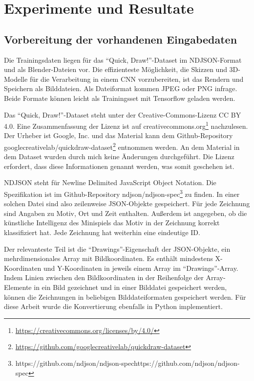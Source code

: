 \chapter{Experimente und Resultate}
\label{ch:conduct}

\section{Vorbereitung der vorhandenen Eingabedaten}
\label{sec:preparation}
Die Trainingsdaten liegen für das ``Quick, Draw!''-Dataset im NDJSON-Format und als Blender-Dateien vor. Die effizienteste Möglichkeit, die Skizzen und 3D-Modelle für die Verarbeitung in einem CNN vorzubereiten, ist das Rendern und  Speichern als Bilddateien. Als Dateiformat kommen JPEG oder PNG infrage. Beide Formate können leicht als Trainingsset mit Tensorflow geladen werden.

Das ``Quick, Draw!''-Dataset steht unter der Creative-Commons-Lizenz CC BY 4.0. Eine Zusammenfassung der Lizenz ist auf creativecommons.org\footnote{\href{https://creativecommons.org/licenses/by/4.0/}{https://creativecommons.org/licenses/by/4.0/}} nachzulesen. Der Urheber ist Google, Inc. und das Material kann dem Github-Repository googlecreativelab/quickdraw-dataset\footnote{\href{https://github.com/googlecreativelab/quickdraw-dataset}{https://github.com/googlecreativelab/quickdraw-dataset}} entnommen werden. An dem Material in dem Dataset wurden durch mich keine Änderungen durchgeführt. Die Lizenz erfordert, dass diese Informationen genannt werden, was somit geschehen ist.

NDJSON steht für Newline Delimited JavaScript Object Notation. Die Spezifikation ist im Github-Repository ndjson/ndjson-spec\footnote{{https://github.com/ndjson/ndjson-spec}{https://github.com/ndjson/ndjson-spec}} zu finden. In einer solchen Datei sind also zeilenweise JSON-Objekte gespeichert. Für jede Zeichnung sind Angaben zu Motiv, Ort und Zeit enthalten. Außerdem ist angegeben, ob die künstliche Intelligenz des Minispiels das Motiv in der Zeichnung korrekt klassifiziert hat. Jede Zeichnung hat weiterhin eine eindeutige ID.

Der relevanteste Teil ist die ``Drawings''-Eigenschaft der JSON-Objekte, ein mehrdimensionales Array mit Bildkoordinaten. Es enthält mindestens X-Koordinaten und Y-Koordinaten in jeweils einem Array im ``Drawings''-Array. Indem Linien zwischen den Bildkoordinaten in der Reihenfolge der Array-Elemente in ein Bild gezeichnet und in einer Bilddatei gespeichert werden, können die Zeichnungen in beliebigen Bilddateiformaten gespeichert werden. Für diese Arbeit wurde die Konvertierung ebenfalls in Python implementiert.

